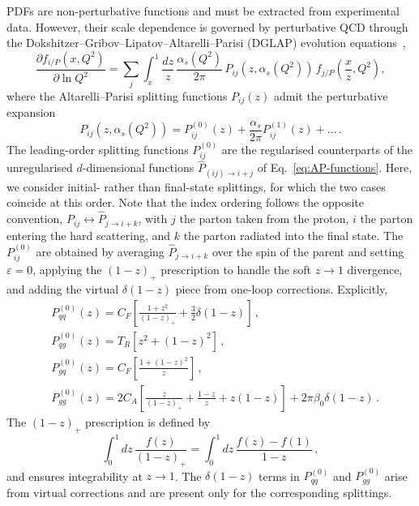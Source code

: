 PDFs are non-perturbative functions and must be extracted from experimental data.
However, their scale dependence is governed by perturbative QCD through the Dokshitzer--Gribov--Lipatov--Altarelli--Parisi (DGLAP) evolution equations~\cite{Gribov:1972ri,Dokshitzer:1977sg,Altarelli:1977zs}, 
\begin{equation}
\label{eq:DGLAP}
    \frac{\partial f_{i/P}(x,Q^2)}{\partial\ln Q^2}
    = \sum_{j} \int_x^1 \frac{dz}{z}\,
      \frac{\alpha_s(Q^2)}{2\pi}\,
      P_{ij}(z,\alpha_s(Q^2))\,
      f_{j/P}\!\left(\frac{x}{z}, Q^2\right),
\end{equation}
where the Altarelli--Parisi splitting functions $P_{ij}(z)$ admit the perturbative expansion
\begin{equation}
	P_{ij}(z,\alpha_s(Q^2)) = P_{ij}^{(0)}(z)+\frac{\alpha_s}{2\pi} P_{ij}^{(1)}(z)+\dots\,.
\end{equation}
The leading-order splitting functions $P_{ij}^{(0)}$ are the
regularised counterparts of the unregularised $d$-dimensional functions
$\hat{P}_{(ij)\to i+j}$ of Eq.~\eqref{eq:AP-functions}. Here, we consider
initial- rather than final-state splittings, for which the two cases
coincide at this order. Note that the index ordering follows the opposite convention,
$P_{ij} \leftrightarrow  \hat{P}_{j\to i+k}$, with $j$ the parton taken from the proton, $i$
the parton entering the hard scattering, and $k$ the parton radiated
into the final state. The $P_{ij}^{(0)}$ are obtained by averaging $\hat{P}_{j\to i+k}$ over the
spin of the parent and setting $\varepsilon=0$, applying the $(1-z)_+$
prescription to handle the soft $z\to1$ divergence, and adding the
virtual $\delta(1-z)$ piece from one-loop corrections. Explicitly,
\begin{equation}
\label{eq:splitting-func-real-virt}
\begin{aligned}
&P_{qq}^{(0)}(z)=C_F\left[\frac{1+z^2}{(1-z)_+}+\frac{3}{2}\delta(1-z)\right]\,,\\
&P_{qg}^{(0)}(z)=T_R\left[z^2+(1-z)^2\right]\,,\\
&P_{gq}^{(0)}(z)=C_F\left[\frac{1+(1-z)^2}{z}\right]\,,\\
&P_{gg}^{(0)}(z)=2C_A\left[\frac{z}{(1-z)_+}+\frac{1-z}{z}+z(1-z)\right]+2\pi\beta_0\delta(1-z)\,.
\end{aligned}
\end{equation}
The $(1-z)_+$ prescription is defined by
\begin{equation}
\int_0^1 dz\,\frac{f(z)}{(1-z)_+} = \int_0^1 dz\,\frac{f(z)-f(1)}{1-z}\,,
\end{equation}
and ensures integrability at $z\to1$. The $\delta(1-z)$ terms in
$P_{qq}^{(0)}$ and $P_{gg}^{(0)}$ arise from virtual corrections
and are present only for the corresponding splittings.

